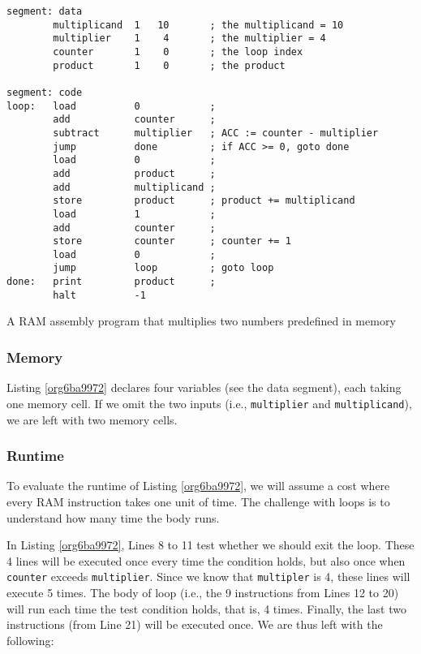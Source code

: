 \documentclass[11pt]{article}
\begin{document}
\begin{listing}[htbp]
\begin{verbatim}
segment: data
        multiplicand  1   10       ; the multiplicand = 10
        multiplier    1    4       ; the multiplier = 4
        counter       1    0       ; the loop index
        product       1    0       ; the product

segment: code
loop:   load          0            ;
        add           counter      ;
        subtract      multiplier   ; ACC := counter - multiplier 
        jump          done         ; if ACC >= 0, goto done
        load          0            ;
        add           product      ;
        add           multiplicand ;
        store         product      ; product += multiplicand
        load          1            ;
        add           counter      ;
        store         counter      ; counter += 1
        load          0            ;
        jump          loop         ; goto loop
done:   print         product      ;
        halt          -1
\end{verbatim}
\caption{\label{org6ba9972}A RAM assembly program that multiplies two numbers predefined in memory}
\end{listing}

\subsubsection*{Memory}
\label{sec:org5489f67}

Listing \ref{org6ba9972} declares four variables (see the data
segment), each taking one memory cell. If we omit the two inputs (i.e.,
\texttt{multiplier} and \texttt{multiplicand}), we are left with two memory cells.

\subsubsection*{Runtime}
\label{sec:org84bfcba}

To evaluate the runtime of Listing \ref{org6ba9972}, we will
assume a cost where every RAM instruction takes one unit of time. The
challenge with loops is to understand how many time the body runs.

In Listing \ref{org6ba9972}, Lines 8 to 11
test whether we should exit the loop. These 4 lines will be executed
once every time the condition holds, but also once when \texttt{counter}
exceeds \texttt{multiplier}. Since we know that \texttt{multipler} is 4, these lines
will execute 5 times. The body of loop (i.e., the 9 instructions from
Lines 12 to 20) will run each time the test
condition holds, that is, 4 times. Finally, the last two instructions
(from Line 21) will be executed once. We are thus left with
the following:
\end{document}
